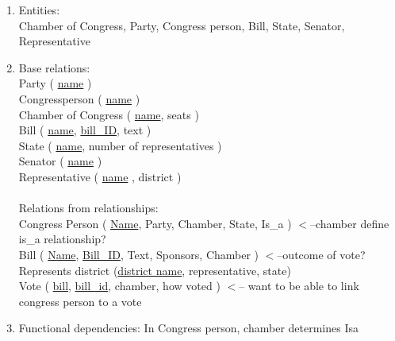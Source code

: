 \documentclass{article}
\begin{document}
\begin{enumerate}

\item Entities:\\ Chamber of Congress, Party, Congress person, Bill, State, Senator, Representative

\item Base relations:\\ Party ( \underline{name} )\\ Congressperson ( \underline{name} ) \\ Chamber of Congress ( \underline{name}, seats )\\ Bill ( \underline{name}, \underline{bill\_ID}, text )\\ State ( \underline{name}, number of representatives ) \\ Senator ( \underline{name} ) \\ Representative ( \underline{name} , district ) \\
\\
Relations from relationships: \\
Congress Person ( \underline{Name}, Party, Chamber, State, Is\_a ) $<$--chamber define is\_a relationship? \\ 
Bill ( \underline{Name}, \underline{Bill\_ID}, Text, Sponsors, Chamber ) $<$--outcome of vote? \\ 
Represents district (\underline{district name}, representative, state) \\
Vote ( \underline{bill}, \underline{bill\_id}, chamber, how voted ) $<$-- want to be able to link congress person to a vote

\item Functional dependencies: In Congress person, chamber determines Isa

\end{enumerate}
\end{document}
